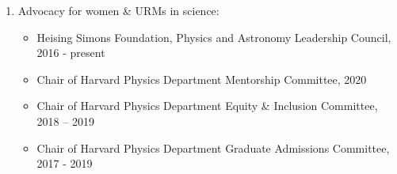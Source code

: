 \documentclass[12pt]{article}
\begin{document}
\begin{enumerate}
\item Advocacy for women \& URMs in science:
\begin{itemize}
    \item Heising Simons Foundation, Physics and Astronomy Leadership Council, 2016 - present
    \item Chair of Harvard Physics Department Mentorship Committee, 2020
    \item Chair of Harvard Physics Department Equity \& Inclusion Committee, 2018 – 2019
    \item Chair of Harvard Physics Department Graduate Admissions Committee, 2017 - 2019
\end{itemize}

\end{enumerate}
\end{document}
